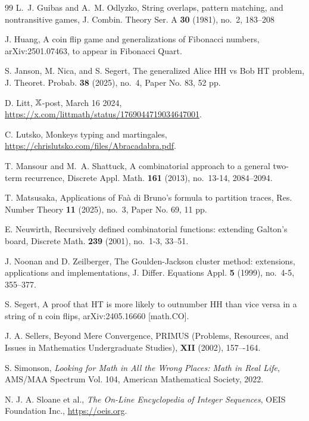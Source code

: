 \documentclass[10pt]{amsart}
\theoremstyle{definition}
\theoremstyle{remark}
\begin{document}
\begin{thebibliography}{99}
L.~J. Guibas and A.~M. Odlyzko, String overlaps, pattern matching, and nontransitive games, J. Combin. Theory Ser. A {\bf 30} (1981), no.~2, 183--208

J. Huang, A coin flip game and generalizations of Fibonacci numbers, arXiv:2501.07463, to appear in Fibonacci Quart.

S. Janson, M. Nica, and S. Segert, The generalized Alice HH vs Bob HT problem, J. Theoret. Probab. {\bf 38} (2025), no.~4, Paper No. 83, 52 pp.

D. Litt, $\Bbb{X}$-post, March 16 2024, \url{https://x.com/littmath/status/1769044719034647001}.

C. Lutsko, Monkeys typing and martingales, \url{https://chrislutsko.com/files/Abracadabra.pdf}.



T. Mansour and M.~A. Shattuck, A combinatorial approach to a general two-term recurrence, Discrete Appl. Math. {\bf 161} (2013), no.~13-14, 2084--2094.

T. Matsusaka, Applications of Fa\`a{} di Bruno's formula to partition traces, Res. Number Theory {\bf 11} (2025), no.~3, Paper No. 69, 11 pp.

E. Neuwirth, Recursively defined combinatorial functions: extending Galton's board, Discrete Math. {\bf 239} (2001), no.~1-3, 33--51.

J. Noonan and D. Zeilberger, The Goulden-Jackson cluster method: extensions, applications and implementations, J. Differ. Equations Appl. {\bf 5} (1999), no.~4-5, 355--377.

S. Segert, A proof that HT is more likely to outnumber HH than vice versa in a string of n coin flips, arXiv:2405.16660 [math.CO].

J. A. Sellers, Beyond Mere Convergence,  PRIMUS (Problems, Resources, and Issues in Mathematics Undergraduate Studies), {\bf XII} (2002), 157–-164.

S. Simonson, {\it Looking for Math in All the Wrong Places: Math in Real Life}, AMS/MAA Spectrum Vol. 104, American Mathematical Society, 2022.

N. J. A. Sloane et al., 
{\it The On-Line Encyclopedia of Integer Sequences},
OEIS Foundation Inc., \url{https://oeis.org}.


\end{thebibliography}
\end{document}
